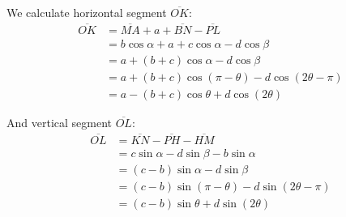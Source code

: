 \documentclass[11pt]{article}
\begin{document}
We calculate horizontal segment $\overline{OK}$:
\begin{align}
\overline{OK} &= \overline{MA} + a + \overline{BN} - \overline{PL} \nonumber\\
 &= b\cos{\alpha} + a + c\cos{\alpha} - d\cos{\beta} \nonumber\\
 &= a + (b+c)\cos{\alpha} - d\cos{\beta} \nonumber\\
 &= a + (b+c)\cos{(\pi-\theta)} - d\cos{(2\theta - \pi)} \nonumber\\
 &= a - (b+c)\cos{\theta} + d\cos{(2\theta)}
\end{align} 

And vertical segment $\overline{OL}$:
\begin{align}
\overline{OL} &= \overline{KN} - \overline{PH} - \overline{HM} \nonumber\\
 &= c\sin{\alpha} - d\sin{\beta} - b\sin{\alpha} \nonumber\\
 &= (c-b)\sin{\alpha} - d\sin{\beta} \nonumber\\
 &= (c-b)\sin{(\pi-\theta)} - d\sin{(2\theta-\pi)} \nonumber\\
 &= (c-b)\sin{\theta} + d\sin{(2\theta)}
\end{align}
\end{document}

